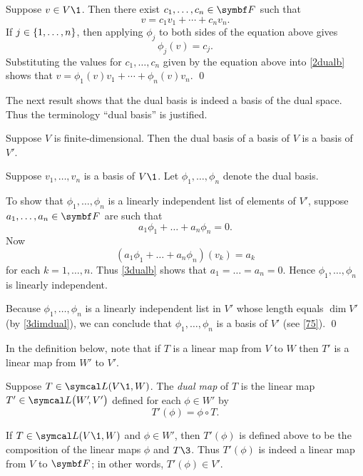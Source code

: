 \proof
Suppose $v \in V\1$. Then there exist $c_1, \ldots, c_n \in \F{}$ such that
\begin{equation} \label{2dualb}
v = c_1 v_1 + \cdots + c_n v_n.
\end{equation}%
If $j \in \{1, \ldots, n\}$, then applying $\phi_j$ to both sides of the equation above gives
\[
\phi_j(v) = c_j.
\]
Substituting the values for $c_1, \ldots, c_n$ given by the equation above into \ref{2dualb} shows that
$v = \phi_1(v) v_1 + \cdots + \phi_n(v) v_n$.
\qed

The next result shows that the dual basis is indeed a basis of the dual space. Thus the terminology ``dual basis'' is justified.

{Suppose $V$ is finite-dimensional. Then the dual basis of a basis of $V$ is a basis of $V'\!$.}

\proof
Suppose $v_1, \dots, v_n$ is a basis of $V\1$. Let $\phi_1, \dots, \phi_n$ denote the dual basis.

To show that $\phi_1, \dots, \phi_n$ is a linearly independent list of elements of $V'\!$, suppose $a_1, \dots, a_n \in \F{}$ are such that
\begin{equation} \label{3dualb}
a_1 \phi_1 + \dots + a_n \phi_n = 0.
\end{equation}%
Now
\[
(a_1 \phi_1 + \dots + a_n \phi_n)(v_k) = a_k
\]
for each $k = 1, \dots, n$. Thus \ref{3dualb} shows that $a_1 = \dots = a_n = 0$. Hence $\phi_1, \dots, \phi_n$ is linearly \mbox{independent}.

Because $\phi_1, \dots, \phi_n$ is a linearly independent list in $V'\!$ whose length equals $\dim V'$ (by \ref{3dimdual}), we can conclude that $\phi_1, \dots, \phi_n$ is a basis of $V'\!$ (see \ref{75}).
\qed

In the definition below, note that if $T$ is a linear map from $V$ to $W$ then $T'$ is a linear map from $W'$ to $V'\!$.

{Suppose $T \in \L(V\1,W)$. The \emph{dual map} of $T$ is the linear map $T' \in \L\paren[\big]{W'\!, V'}$ defined for each $\phi \in W'\!$ by
\[
T' \! (\phi) = \phi \circ T.
\]
}

If $T \in \L(V\1,W)$ and $\phi \in W'\!$, then $T' \! (\phi)$ is defined above to be the composition of the linear maps $\phi$ and $T\3$. Thus $T' \! (\phi)$ is indeed a linear map from $V$ to $\F{}$; in other words, $T' \! (\phi) \in V'\!$.

